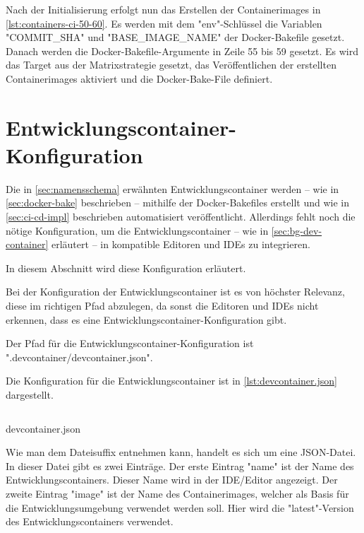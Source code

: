 Nach der Initialisierung erfolgt nun das Erstellen der Containerimages in \cref{lst:containers-ci-50-60}. Es werden mit dem "env"-Schlüssel die Variablen "COMMIT\_SHA" und "BASE\_IMAGE\_NAME" der Docker-Bakefile gesetzt. Danach werden die Docker-Bakefile-Argumente in Zeile 55 bis 59 gesetzt. Es wird das Target aus der Matrixstrategie gesetzt, das Veröffentlichen der erstellten Containerimages aktiviert und die Docker-Bake-File definiert.

\section{Entwicklungscontainer-Konfiguration} \label{sec:dev-container-impl}

Die in \cref{sec:namensschema} erwähnten Entwicklungscontainer werden – wie in \cref{sec:docker-bake} beschrieben – mithilfe der Docker-Bakefiles erstellt und wie in \cref{sec:ci-cd-impl} beschrieben automatisiert veröffentlicht. Allerdings fehlt noch die nötige Konfiguration, um die Entwicklungscontainer – wie in \cref{sec:bg-dev-container} erläutert – in kompatible Editoren und IDEs zu integrieren. 

In diesem Abschnitt wird diese Konfiguration erläutert.

Bei der Konfiguration der Entwicklungscontainer ist es von höchster Relevanz, diese im richtigen Pfad abzulegen, da sonst die Editoren und IDEs nicht erkennen, dass es eine Entwicklungscontainer-Konfiguration gibt. 

Der Pfad für die Entwicklungscontainer-Konfiguration ist ".devcontainer/devcontainer.json".

Die Konfiguration für die Entwicklungscontainer ist in \cref{lst:devcontainer.json} dargestellt.

\begin{listing}[H]
    \inputminted{json}{./code-examples/devcontainer.json}
    \caption{devcontainer.json}
    \label{lst:devcontainer.json}
\end{listing}

Wie man dem Dateisuffix entnehmen kann, handelt es sich um eine JSON-Datei. In dieser Datei gibt es zwei Einträge. Der erste Eintrag "name" ist der Name des Entwicklungscontainers. Dieser Name wird in der IDE/Editor angezeigt. Der zweite Eintrag "image" ist der Name des Containerimages, welcher als Basis für die Entwicklungsumgebung verwendet werden soll. Hier wird die "latest"-Version des Entwicklungscontainers verwendet. 
